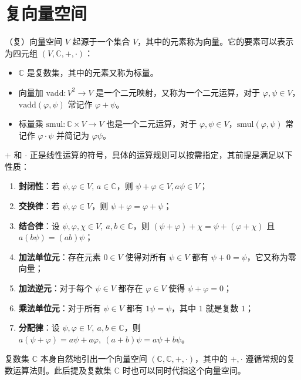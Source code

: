 \documentclass[cn,10pt,math=newtx,citestyle=gb7714-2015,bibstyle=gb7714-2015]{elegantbook}
\def\C{\mathbb C}
\def\vphi{\varphi}
\def\ra{\rightarrow}
\begin{document}
\section{复向量空间}
\begin{definition}[（复）向量空间]\label{def:cmplx_vctr_spc}
   （复）向量空间 $V$ 起源于一个集合 $V$，其中的元素称为向量。它的要素可以表示为四元组 $(V,\C,+,\cdot)$：
   \begin{itemize}
       \item $\C$ 是复数集，其中的元素又称为标量。
       \item 向量加 $\text{vadd}:V^2\ra V$ 是一个二元映射，又称为一个二元运算，对于 $\vphi,\psi\in V$，$\text{vadd}(\vphi,\psi)$ 常记作 $\vphi+\psi$。
       \item 标量乘 $\text{smul}:\C\times V\ra V$ 也是一个二元运算，对于 $\vphi,\psi\in V$，$\text{smul}(\vphi,\psi)$ 常记作 $\vphi\cdot\psi$ 并简记为 $\vphi\psi$。
   \end{itemize}
   $+$ 和 $\cdot$ 正是线性运算的符号，具体的运算规则可以按需指定，其前提是满足以下性质：
   \begin{enumerate}
        \item \textbf{封闭性}：若 $\psi,\vphi\in V,\, a\in\C$，则 $\psi+\vphi\in V, a\psi\in V$；
        \item \textbf{交换律}：若 $\psi,\vphi\in V$，则 $\psi+\vphi=\vphi+\psi$；
        \item \textbf{结合律}：设 $\psi,\vphi,\chi\in V,\ a,b\in\C$，则 $(\psi+\vphi)+\chi=\psi+(\vphi+\chi)$ 且 $a(b\psi)=(ab)\psi$；
        \item \textbf{加法单位元}：存在元素 $0\in V$ 使得对所有 $\psi\in V$ 都有 $\psi + 0 =\psi$，它又称为零向量；
        \item \textbf{加法逆元}：对于每个 $\psi\in V$ 都存在 $\vphi\in V$ 使得 $\psi+\vphi=0$；
        \item \textbf{乘法单位元}：对于所有 $\psi\in V$ 都有 $1\psi=\psi$，其中 $1$ 就是复数 $1$；
        \item \textbf{分配律}：设 $\psi,\vphi\in V,\ a,b\in\C$，则 $a(\psi+\vphi)=a\psi+a\vphi,\ (a+b)\psi=a\psi+b\psi$。
    \end{enumerate}
\end{definition}

\begin{instance}
复数集 $\C$ 本身自然地引出一个向量空间 $(\C,\C,+,\cdot)$，其中的 $+,\cdot$ 遵循常规的复数运算法则。此后提及复数集 $\C$ 时也可以同时代指这个向量空间。
\end{instance}
\end{document}
